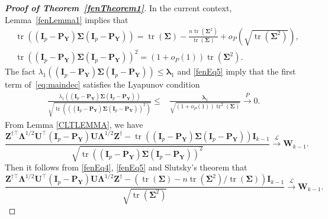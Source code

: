 \documentclass[10pt]{book}
\theoremstyle{definition}
\DeclareMathOperator{\mytr}{tr}
\newcommand{\bZ}{\mathbf{Z}}
\newcommand{\bP}{\mathbf{P}}
\newcommand{\bY}{\mathbf{Y}}
\newcommand{\bI}{\mathbf{I}}
\newcommand{\bU}{\mathbf{U}}
\newcommand{\bW}{\mathbf{W}}
\newcommand{\bfsym}[1]{\ensuremath{\boldsymbol{#1}}}
\def\blambda {\bfsym {\lambda}}
\def\bLambda {\bfsym {\Lambda}}
\def\bSigma {\bfsym {\Sigma}}
\begin{document}
\begin{proof}[\textbf{Proof of Theorem~\ref{fenTheorem1}}]
    In the current context, Lemma~\ref{fenLemma1} implies that
    \begin{align}
        &\mytr \left( (\bI_p-\bP_{\bY})\bSigma (\bI_p-\bP_{\bY})\right)=
        \mytr(\bSigma)-\frac{n\mytr(\bSigma^2)}{\mytr(\bSigma)}
        +o_P(\sqrt{\mytr(\bSigma^2)}),
        \label{fenEq4}
        \\
        &
        \mytr \left( (\bI_p-\bP_{\bY})\bSigma (\bI_p-\bP_{\bY})\right)^2
        =
        (1+o_P(1))
        \mytr(\bSigma^2)
        .
        \label{fenEq5}
    \end{align}
The fact $\lambda_1\left((\bI_p-\bP_\bY)\bSigma(\bI_p-\bP_\bY)\right)\leq \blambda_1$ and \eqref{fenEq5} imply that the first term of~\eqref{eq:maindec} satisfies the Lyapunov condition
\begin{equation*}
\begin{split}
\frac{\lambda_1\left((\bI_p-\bP_\bY)\bSigma(\bI_p-\bP_\bY)\right)}{\sqrt{\mytr\left(\left((\bI_p-\bP_\bY)\bSigma(\bI_p-\bP_\bY)\right)^2\right)}}
\leq &
\frac{
    \blambda_1
}{
    \sqrt{(1+o_P(1))\mytr^2(\bSigma)}
}
\xrightarrow{P} 0.
\end{split}
\end{equation*}
From Lemma \ref{CLTLEMMA}, we have
\begin{equation*}
    \frac{
    \bZ^{\dagger \top} \bLambda^{1/2}\bU^\top (\bI_p-\bP_{\bY})\bU\bLambda^{1/2}\bZ^{\dagger}
    -
        \mytr \left( (\bI_p-\bP_{\bY})\bSigma (\bI_p-\bP_{\bY})\right)
     \bI_{k-1}
 }{
     \sqrt{
        \mytr \left( (\bI_p-\bP_{\bY})\bSigma (\bI_p-\bP_{\bY})\right)^2
}
 }
\xrightarrow{\mathcal{L}} \bW_{k-1}.
\end{equation*}
Then it follows from \eqref{fenEq4}, \eqref{fenEq5} and Slutsky's theorem that
\begin{equation}
    \frac{
     \bZ^{\dagger\top} \bLambda^{1/2} \bU^\top (\bI_p-\bP_{\bY})\bU\bLambda^{1/2}\bZ^{\dagger}
 -\left(\mytr(\bSigma)-{n\mytr(\bSigma^2)}/{\mytr(\bSigma)}\right)\bI_{k-1} 
 }{
     \sqrt{\mytr(\bSigma^2)}
 }
\xrightarrow{\mathcal{L}} \bW_{k-1}.
    \label{bufenEq1}
\end{equation}


\end{proof}
\end{document}

